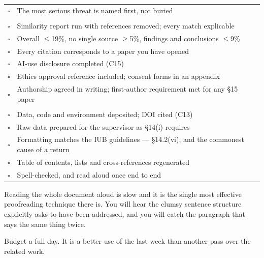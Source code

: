 \begin{center}
\begin{tabular}{@{}L{0.8cm}L{13.0cm}@{}}
$\square$ & The most serious threat is named first, not buried \\
\addlinespace
{}\\[2pt]
$\square$ & Similarity report run with references removed; every match
            explicable \\
$\square$ & Overall $\le$19\%, no single source $\ge$5\%, findings and
            conclusions $\le$9\% \\
$\square$ & Every citation corresponds to a paper you have opened \\
$\square$ & AI-use disclosure completed (C15) \\
$\square$ & Ethics approval reference included; consent forms in an appendix \\
$\square$ & Authorship agreed in writing; first-author requirement met for any
            \S15 paper \\
\addlinespace
{}\\[2pt]
$\square$ & Data, code and environment deposited; DOI cited (C13) \\
$\square$ & Raw data prepared for the supervisor as \S14(i) requires \\
$\square$ & Formatting matches the IUB guidelines --- \S14.2(vi), and the
            commonest cause of a return \\
$\square$ & Table of contents, lists and cross-references regenerated \\
$\square$ & Spell-checked, and read aloud once end to end \\
\end{tabular}
\end{center}

\begin{alertbox}
Reading the whole document aloud is slow and it is the single most effective
proofreading technique there is. You will hear the clumsy sentence structure
 explicitly asks to have been addressed, and you
will catch the paragraph that says the same thing twice.

\medskip
Budget a full day. It is a better use of the last week than another pass over
the related work.
\end{alertbox}

